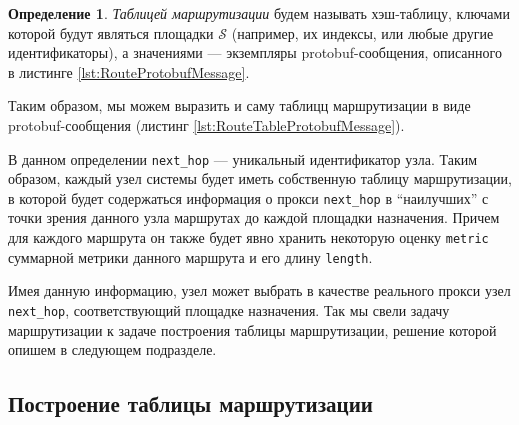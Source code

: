 \documentclass{article}
\theoremstyle{plain}
\theoremstyle{plain}
\theoremstyle{plain}
\theoremstyle{plain}
\theoremstyle{definition}
\newtheorem{definition}{Определение}[section]
\theoremstyle{remark}
\theoremstyle{plain}
\begin{document}
\begin{definition}
    \textit{Таблицей маршрутизации} будем называть хэш-таблицу, ключами которой будут являться площадки $\mathcal{S}$ (например, их индексы, или любые другие идентификаторы), а значениями --- экземпляры protobuf-сообщения, описанного в листинге \ref{lst:RouteProtobufMessage}.
\end{definition}
    
    
Таким образом, мы можем выразить и саму таблицц маршрутизации в виде protobuf-сообщения (листинг \ref{lst:RouteTableProtobufMessage}).
    

В данном определении \texttt{next\_hop} --- уникальный идентификатор узла. Таким образом, каждый узел системы будет иметь собственную таблицу маршрутизации, в которой будет содержаться информация о прокси \texttt{next\_hop} в \enquote{наилучших} с точки зрения данного узла маршрутах до каждой площадки назначения. Причем для каждого маршрута он также будет явно хранить некоторую оценку \texttt{metric} суммарной метрики данного маршрута и его длину \texttt{length}.

Имея данную информацию, узел может выбрать в качестве реального прокси узел \texttt{next\_hop}, соответствующий площадке назначения. Так мы свели задачу маршрутизации к задаче построения таблицы маршрутизации, решение которой опишем в следующем подразделе.

\subsection{Построение таблицы маршрутизации}
\end{document}
